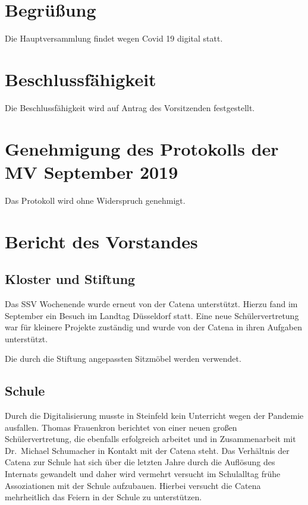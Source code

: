 \documentclass[a4paper, 11pt]{article}
\begin{document}
\newpage

\section*{Begrüßung}

Die Hauptversammlung findet wegen Covid 19 digital statt.


\section*{Beschlussfähigkeit}

Die Beschlussfähigkeit wird auf Antrag des Vorsitzenden festgestellt.

\section*{Genehmigung des Protokolls der MV September 2019}

Das Protokoll wird ohne Widerspruch genehmigt.

\section*{Bericht des Vorstandes}

\subsection*{Kloster und Stiftung}

Das SSV Wochenende wurde erneut von der Catena unterstützt. Hierzu fand im September ein Besuch im Landtag Düsseldorf statt.
Eine neue Schülervertretung war für kleinere Projekte zuständig und wurde von der Catena in ihren Aufgaben unterstützt.

Die durch die Stiftung angepassten Sitzmöbel werden verwendet.

\subsection*{Schule}

Durch die Digitalisierung musste in Steinfeld kein Unterricht wegen der Pandemie ausfallen.
Thomas Frauenkron berichtet von einer neuen großen Schülervertretung, die ebenfalls erfolgreich arbeitet und in Zusammenarbeit mit Dr.~Michael Schumacher in Kontakt mit der Catena steht.
Das Verhältnis der Catena zur Schule hat sich über die letzten Jahre durch die Auflösung des Internats gewandelt und daher wird vermehrt versucht im Schulalltag frühe Assoziationen mit der Schule aufzubauen.
Hierbei versucht die Catena mehrheitlich das Feiern in der Schule zu unterstützen.
\end{document}
